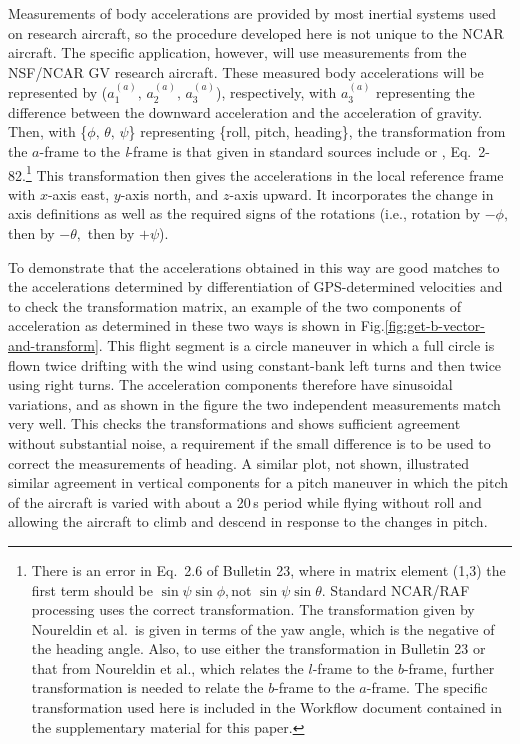 \documentclass[english,british,amtd,bookmarks=false,unicode=true]{copernicus}\usepackage[]{graphicx}\usepackage[]{color}
\begin{document}
Measurements of body accelerations are provided by most inertial systems
used on research aircraft, so the procedure developed here is not
unique to the NCAR aircraft. The specific application, however, will
use measurements from the NSF/NCAR GV research aircraft. These measured
body accelerations will be represented by ($a_{1}^{(a)},\,a_{2}^{(a)},\,a_{3}^{(a)}$),
respectively, with $a_{3}^{(a)}$ representing the difference between
the downward acceleration and the acceleration of gravity. Then, with
\{$\phi,\,\theta,\,\psi$\} representing \{roll, pitch, heading\},
the transformation from the $a$-frame to the \emph{l}-frame is that
given in standard sources include \citet{Bulletin23} or \citet{noureldin2013fundamentals},
Eq.~2-82.\footnote{There is an error in Eq.~2.6 of Bulletin 23, where in matrix element
(1,3) the first term should be $\sin\psi\sin\phi,$not $\sin\psi\sin\theta$.
Standard NCAR/RAF processing uses the correct transformation. The
transformation given by Noureldin et al.~is given in terms of the
yaw angle, which is the negative of the heading angle. Also, to use
either the transformation in Bulletin 23 or that from Noureldin et
al., which relates the $l$-frame to the $b$-frame, further transformation
is needed to relate the $b$-frame to the $a$-frame. The specific
transformation used here is included in the Workflow document contained
in the supplementary material for this paper.} This transformation then gives the accelerations in the local reference
frame with $x$-axis east, $y$-axis north, and $z$-axis upward.
It incorporates the change in axis definitions as well as the required
signs of the rotations (i.e., rotation by $-\phi,$ then by $-\theta,$
then by $+\psi$). 








To demonstrate that the accelerations obtained in this way are good
matches to the accelerations determined by differentiation of GPS-determined
velocities and to check the transformation matrix, an example of the
two components of acceleration as determined in these two ways is
shown in Fig.\ref{fig:get-b-vector-and-transform}. This flight segment
is a circle maneuver in which a full circle is flown twice drifting
with the wind using constant-bank left turns and then twice using
right turns. The acceleration components therefore have sinusoidal
variations, and as shown in the figure the two independent measurements
match very well. This checks the transformations and shows sufficient
agreement without substantial noise, a requirement if the small difference
is to be used to correct the measurements of heading. A similar plot,
not shown, illustrated similar agreement in vertical components for
a pitch maneuver in which the pitch of the aircraft is varied with
about a 20\,s period while flying without roll and allowing the aircraft
to climb and descend in response to the changes in pitch. 
\end{document}
